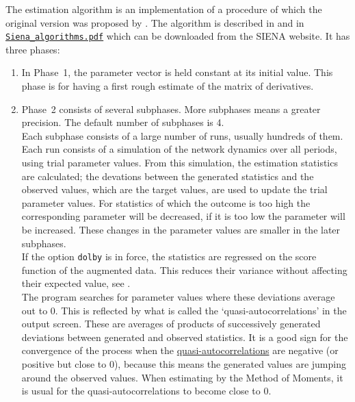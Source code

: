 \documentclass[a4paper,fleqn,11pt]{article}
\newcommand{\+}{\, + \,}
\newcommand{\SI}{{\sf SIENA }}
\begin{document}
The estimation algorithm is an implementation of a procedure of which
the original version was proposed by \citet{RobbinsMonro51}.
The algorithm is
described in \citet{Snijders01, Snijders05}
and in
\href{http://www.stats.ox.ac.uk/~snijders/siena/Siena_algorithms.pdf}{\texttt{Siena\_algorithms.pdf}}
which can be downloaded from the \SI website.
It has %
three phases:
\begin{enumerate}
\item In Phase~1, the parameter vector is held constant at its
initial value.
      This phase is for
      having a first rough estimate of the matrix of derivatives.
\item Phase~2 consists of several subphases.
      More subphases means a greater precision. The default
      number of subphases is 4.\\
      Each subphase consists of a large number of runs, usually hundreds of them.
      Each run consists of a simulation of the network dynamics over all periods,
      using trial parameter values. From this simulation, the estimation statistics
      are calculated;
      the devations between the generated statistics and the observed values,
      which are the target values, are used to update the trial parameter values.
      For statistics of which the outcome is too high the corresponding
      parameter will be decreased, if it is too low the parameter will be increased.
      These changes in the parameter values are smaller in the later subphases.\\
      If the option \texttt{dolby} is in force, the statistics are regressed
      on the score function of the augmented data.
      This reduces their variance without affecting their expected value,
      see \citet{Snijders2013Greenwich}.\\
      The program searches for parameter values where these deviations
      average out to 0. This is reflected by what is called the
      \hypertarget{T_quasiac}{`quasi-auto\-cor\-relations'}
      in the output screen.
      These are averages
      of products of successively generated deviations between
      generated and observed statistics. It is a good sign
      for the convergence of the process when the
      \hyperlink{T_quasiac}{quasi-auto\-correlations}
      are negative (or positive but close to 0),
      because this means the generated values are jumping
      around the observed values.
      When estimating by the Method of Moments, it is usual for the
      quasi-auto\-correlations to become close to 0.

\end{enumerate}
\end{document}
